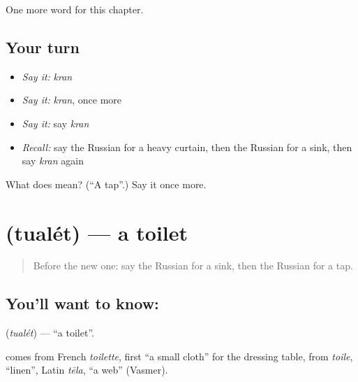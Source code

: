 \begin{grammarlens}[title={What you've built}]
One more word for this chapter.
\end{grammarlens}

\subsection*{Your turn}
\begin{itemize}
\raggedright
  \item \emph{Say it:} \emph{kran}
  \item \emph{Say it:} \emph{kran}, once more
  \item \emph{Say it:} say \emph{kran}
  \item \emph{Recall:} say the Russian for a heavy curtain, then the Russian for a sink, then say \emph{kran} again
\end{itemize}

\begin{tcolorbox}[breakable,colback=teal!4,colframe=teal!35!black,title={Before you move on}]
What does  mean? (\textquotedblleft{}A tap\textquotedblright{}.) Say it once more.
\end{tcolorbox}
\section[\texorpdfstring{\ru{туалет} (tualét)}{туалет (tualét)}]{ (tualét) — a toilet}

\label{lesson:RU-C190-tualet}



\begin{quote}
Before the new one: say the Russian for a sink, then the Russian for a tap.
\end{quote}

\subsection*{You'll want to know: }
\textbf{} (\emph{tualét}) — \textquotedblleft{}a toilet\textquotedblright{}.

\begin{cousinweb}
\textbf{} comes from French \emph{toilette}, first \textquotedblleft{}a small cloth\textquotedblright{} for the dressing table, from \emph{toile}, \textquotedblleft{}linen\textquotedblright{}, Latin \emph{tēla}, \textquotedblleft{}a web\textquotedblright{} (Vasmer).
\end{cousinweb}

